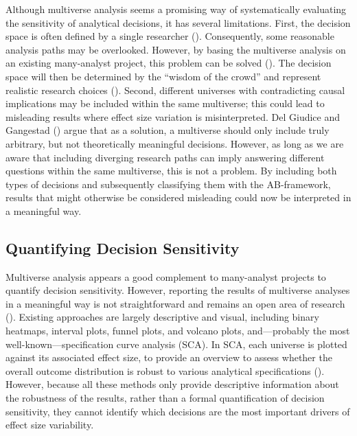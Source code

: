 \documentclass[
  man,
  floatsintext,
  longtable,
  nolmodern,
  notxfonts,
  notimes,
  colorlinks=true,linkcolor=blue,citecolor=blue,urlcolor=blue]{apa7}
\begin{document}
Although multiverse analysis seems a promising way of systematically
evaluating the sensitivity of analytical decisions, it has several
limitations. First, the decision space is often defined by a single
researcher (). Consequently, some reasonable analysis paths may be
overlooked. However, by basing the multiverse analysis on an existing
many-analyst project, this problem can be solved
(). The
decision space will then be determined by the ``wisdom of the crowd''
and represent realistic research choices
(). Second,
different universes with contradicting causal implications may be
included within the same multiverse; this could lead to misleading
results where effect size variation is misinterpreted. Del Giudice and
Gangestad () argue that
as a solution, a multiverse should only include truly arbitrary, but not
theoretically meaningful decisions. However, as long as we are aware
that including diverging research paths can imply answering different
questions within the same multiverse, this is not a problem. By
including both types of decisions and subsequently classifying them with
the AB-framework, results that might otherwise be considered misleading
could now be interpreted in a meaningful way.

\subsection{Quantifying Decision
Sensitivity}\label{quantifying-decision-sensitivity}

Multiverse analysis appears a good complement to many-analyst projects
to quantify decision sensitivity. However, reporting the results of
multiverse analyses in a meaningful way is not straightforward and
remains an open area of research
().
Existing approaches are largely descriptive and visual, including binary
heatmaps, interval plots, funnel plots, and volcano plots,
and---probably the most well-known---specification curve analysis (SCA).
In SCA, each universe is plotted against its associated effect size, to
provide an overview to assess whether the overall outcome distribution
is robust to various analytical specifications
().
However, because all these methods only provide descriptive information
about the robustness of the results, rather than a formal quantification
of decision sensitivity, they cannot identify which decisions are the
most important drivers of effect size variability.
\end{document}
